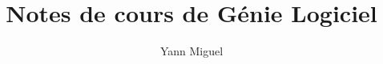 \documentclass[12pt, a4paper]{article}
\title{Notes de cours de Génie Logiciel}
\author{Yann Miguel}
\begin{document}
\ttfamily
\maketitle
\tableofcontents
\newpage









\end{document}
